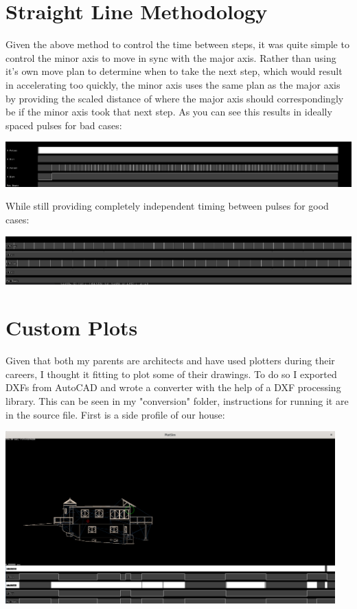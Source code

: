 \documentclass{article}
\begin{document}
\section*{Straight Line Methodology}
Given the above method to control the time between steps, it was quite simple to control the minor axis to move in sync with the major axis. Rather than using it's own move plan to determine when to take the next step, which would result in accelerating too quickly, the minor axis uses the same plan as the major axis by providing the scaled distance of where the major axis should correspondingly be if the minor axis took that next step. As you can see this results in ideally spaced pulses for bad cases:

\begin{center}
  \includegraphics[width=\linewidth]{bad_case.png}
\end{center}

While still providing completely independent timing between pulses for good cases:

\begin{center}
  \includegraphics[width=\linewidth]{good_case.png}
\end{center}

\section*{Custom Plots}
Given that both my parents are architects and have used plotters during their careers, I thought it fitting to plot some of their drawings. To do so I exported DXFs from AutoCAD and wrote a converter with the help of a DXF processing library. This can be seen in my "conversion" folder, instructions for running it are in the source file. First is a side profile of our house:

\begin{center}
  \includegraphics[width=5in]{house_side.png}
\end{center}
\end{document}
